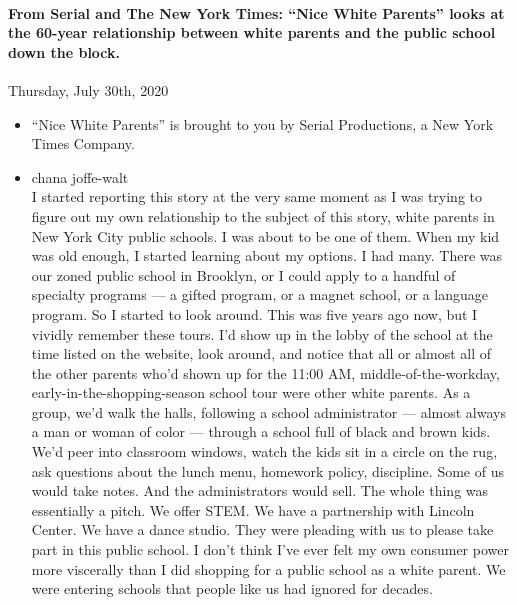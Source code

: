 \hypertarget{from-serial-and-the-new-york-times-nice-white-parents-looks-at-the-60-year-relationship-between-white-parents-and-the-public-school-down-the-block}{%
\paragraph{From Serial and The New York Times: ``Nice White Parents''
looks at the 60-year relationship between white parents and the public
school down the
block.}\label{from-serial-and-the-new-york-times-nice-white-parents-looks-at-the-60-year-relationship-between-white-parents-and-the-public-school-down-the-block}}

Thursday, July 30th, 2020

\begin{itemize}
\item
  ``Nice White Parents'' is brought to you by Serial Productions, a New
  York Times Company.
\item
  chana joffe-walt\\
  I started reporting this story at the very same moment as I was trying
  to figure out my own relationship to the subject of this story, white
  parents in New York City public schools. I was about to be one of
  them. When my kid was old enough, I started learning about my options.
  I had many. There was our zoned public school in Brooklyn, or I could
  apply to a handful of specialty programs --- a gifted program, or a
  magnet school, or a language program. So I started to look around.
  This was five years ago now, but I vividly remember these tours. I'd
  show up in the lobby of the school at the time listed on the website,
  look around, and notice that all or almost all of the other parents
  who'd shown up for the 11:00 AM, middle-of-the-workday,
  early-in-the-shopping-season school tour were other white parents. As
  a group, we'd walk the halls, following a school administrator ---
  almost always a man or woman of color --- through a school full of
  black and brown kids. We'd peer into classroom windows, watch the kids
  sit in a circle on the rug, ask questions about the lunch menu,
  homework policy, discipline. Some of us would take notes. And the
  administrators would sell. The whole thing was essentially a pitch. We
  offer STEM. We have a partnership with Lincoln Center. We have a dance
  studio. They were pleading with us to please take part in this public
  school. I don't think I've ever felt my own consumer power more
  viscerally than I did shopping for a public school as a white parent.
  We were entering schools that people like us had ignored for decades.

\end{itemize}
